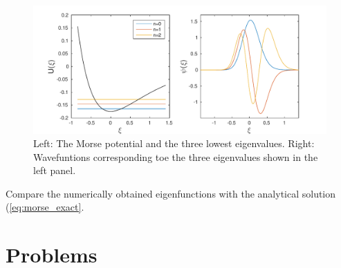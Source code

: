 \begin{figure}
\centering
\includegraphics[width=5.5in]{07.ode3/morse.pdf}
\caption{Left: The Morse potential and the three lowest eigenvalues. Right: Wavefuntions corresponding toe the three eigenvalues shown in the left panel.}\label{fig:morse}
\end{figure}

\bigskip
\exercise
Compare the numerically obtained eigenfunctions  with the  analytical solution (\ref{eq:morse_exact}.


\vfill

\newpage
\noindent
\section{Problems}

